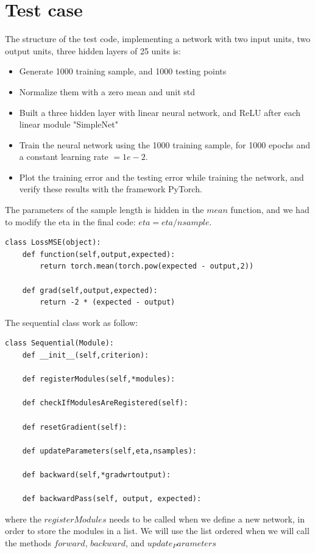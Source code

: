 \documentclass[10pt,final,a4paper]{article}
\begin{document}
\section{Test case}
The structure of the test code, implementing a network with two input units, two output units, three hidden layers of 25 units is:
\begin{itemize}
\item Generate 1000 training sample, and 1000 testing points\\
\item Normalize them with a zero mean and unit std\\
\item Built a three hidden layer with linear neural network, and ReLU after each linear module "SimpleNet"\\
\item Train the neural network using the 1000 training sample, for 1000 epochs and a constant learning rate $=1e-2$.
\item Plot the training error and the testing error while training the network, and verify these results with the framework PyTorch.
\end{itemize}

The parameters of the sample length is hidden in the $mean$ function, and we had to modify the eta in the final code: $eta=eta/nsample$.
\begin{verbatim}
class LossMSE(object):
    def function(self,output,expected):
        return torch.mean(torch.pow(expected - output,2))

    def grad(self,output,expected):
        return -2 * (expected - output)
\end{verbatim}

The sequential class work as follow:
\begin{verbatim}
class Sequential(Module):
    def __init__(self,criterion):

    def registerModules(self,*modules):

    def checkIfModulesAreRegistered(self):

    def resetGradient(self):

    def updateParameters(self,eta,nsamples):

    def backward(self,*gradwrtoutput):

    def backwardPass(self, output, expected):

\end{verbatim}
where the $registerModules$ needs to be called when we define a new network, in order to store the modules in a list. We will use the list ordered when we will call the methods $forward$, $backward$, and $update_Parameters$
\end{document}
